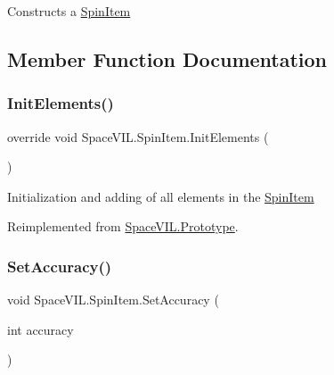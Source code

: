 Constructs a \mbox{\hyperlink{class_space_v_i_l_1_1_spin_item}{Spin\+Item}} 



\subsection{Member Function Documentation}
\mbox{\label{class_space_v_i_l_1_1_spin_item_aad67ed66e70bac7de49fbe0f7271d0a1}} 
\subsubsection{\texorpdfstring{Init\+Elements()}{InitElements()}}
{\footnotesize\ttfamily override void Space\+V\+I\+L.\+Spin\+Item.\+Init\+Elements (\begin{DoxyParamCaption}{ }\end{DoxyParamCaption})\hspace{0.3cm}{\ttfamily [virtual]}}



Initialization and adding of all elements in the \mbox{\hyperlink{class_space_v_i_l_1_1_spin_item}{Spin\+Item}} 



Reimplemented from \mbox{\hyperlink{class_space_v_i_l_1_1_prototype_ac3379fe02923ee155b5b0084abf27420}{Space\+V\+I\+L.\+Prototype}}.

\mbox{\label{class_space_v_i_l_1_1_spin_item_a75968056339e587c2e163b50b1ec0be2}} 
\subsubsection{\texorpdfstring{Set\+Accuracy()}{SetAccuracy()}}
{\footnotesize\ttfamily void Space\+V\+I\+L.\+Spin\+Item.\+Set\+Accuracy (\begin{DoxyParamCaption}\item[{int}]{accuracy }\end{DoxyParamCaption})}



